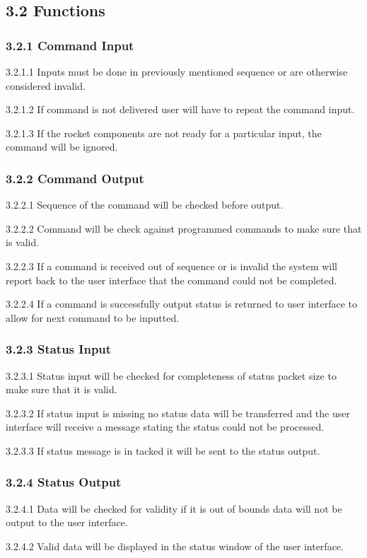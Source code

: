 \documentclass[10pt,draftclsnofoot,onecolumn]{IEEEtran}
\begin{document}
\subsection{3.2 Functions}
\subsubsection{3.2.1 Command Input}
	3.2.1.1 Inputs must be done in previously mentioned sequence or are otherwise considered invalid. \par
	3.2.1.2 If command is not delivered user will have to repeat the command input.\par
	3.2.1.3 If the rocket components are not ready for a particular input, the command will be ignored. \par
\subsubsection{3.2.2 Command Output}
		3.2.2.1  Sequence of the command will be checked before output.\par
	3.2.2.2 Command will be check against programmed commands to make sure that is valid.\par
	3.2.2.3 If a command is received out of sequence or is invalid the system will report back to the user interface that the command could not be 		completed.\par
	3.2.2.4 If a command is successfully output status is returned to user interface to allow for next command to be inputted.\par
\subsubsection{3.2.3 Status Input}
	3.2.3.1  Status input will be checked for completeness of status packet size to make sure that it is valid.\par
	3.2.3.2 If status input is missing no status data will be transferred and the user interface will receive a message stating the status could not be processed.\par
	3.2.3.3 If status message is in tacked it will be sent to the status output.\par
\subsubsection{3.2.4 Status Output}
	3.2.4.1 Data will be checked for validity if it is out of bounds data will not be output to the user interface.\par
	3.2.4.2 Valid data will be displayed in the status window of the user interface.\par
\end{document}
